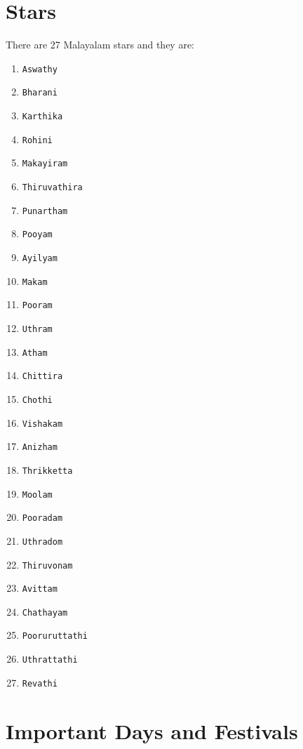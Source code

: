 \documentclass[10pt,twoside]{article}
\begin{document}
\section{Stars}
There are 27 Malayalam stars and they are:
\begin{enumerate}
\item \verb|Aswathy|
\item \verb|Bharani|
\item \verb|Karthika|
\item \verb|Rohini|
\item \verb|Makayiram|
\item \verb|Thiruvathira|
\item \verb|Punartham|
\item \verb|Pooyam|
\item \verb|Ayilyam|
\item \verb|Makam|
\item \verb|Pooram|
\item \verb|Uthram|
\item \verb|Atham|
\item \verb|Chittira|
\item \verb|Chothi|
\item \verb|Vishakam|
\item \verb|Anizham|
\item \verb|Thrikketta|
\item \verb|Moolam|
\item \verb|Pooradam|
\item \verb|Uthradom|
\item \verb|Thiruvonam|
\item \verb|Avittam|
\item \verb|Chathayam|
\item \verb|Pooruruttathi|
\item \verb|Uthrattathi|
\item \verb|Revathi|
\end{enumerate}

\section{Important Days and Festivals}
\end{document}
